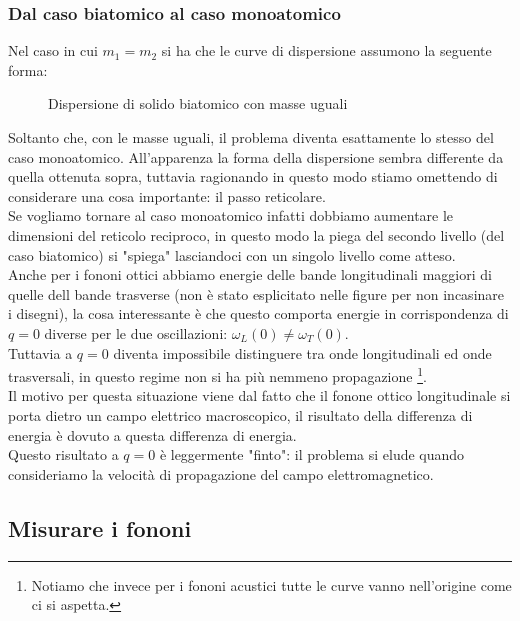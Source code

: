 \subsubsection{Dal caso biatomico al caso monoatomico}
\label{subsubsec:Dal caso biatomico al caso monoatomico}
Nel caso in cui $m_1=m_2$ si ha che le curve di dispersione assumono la seguente forma:
\begin{figure}[H]
    \centering
    \caption{Dispersione di solido biatomico con masse uguali}
    \label{fig:dispersione-di-solido-biatomico-con-masse-uguali}
\end{figure}
\noindent
Soltanto che, con le masse uguali, il problema diventa esattamente lo stesso del caso monoatomico. All'apparenza la forma della dispersione sembra differente da quella ottenuta sopra, tuttavia ragionando in questo modo stiamo omettendo di considerare una cosa importante: il passo reticolare.\\
Se vogliamo tornare al caso monoatomico infatti dobbiamo aumentare le dimensioni del reticolo reciproco, in questo modo la piega del secondo livello (del caso biatomico) si "spiega" lasciandoci con un singolo livello come atteso.\\
Anche per i fononi ottici abbiamo energie delle bande longitudinali maggiori di quelle dell bande trasverse (non è stato esplicitato nelle figure per non incasinare i disegni), la cosa interessante è che questo comporta energie in corrispondenza di $q=0$ diverse per le due oscillazioni: $\omega _L(0) \neq \omega _T(0)$.\\
Tuttavia a $q=0$ diventa impossibile distinguere tra onde longitudinali ed onde trasversali, in questo regime non si ha più nemmeno propagazione \footnote{Notiamo che invece per i fononi acustici tutte le curve vanno nell'origine come ci si aspetta.}. \\
Il motivo per questa situazione viene dal fatto che il fonone ottico longitudinale si porta dietro un campo elettrico macroscopico, il risultato della differenza di energia è dovuto a questa differenza di energia. \\
Questo risultato a $q=0$ è leggermente "finto": il problema si elude quando consideriamo la velocità di propagazione del campo elettromagnetico. 
\subsection{Misurare i fononi}
\label{subsec:Misurare i fononi}
